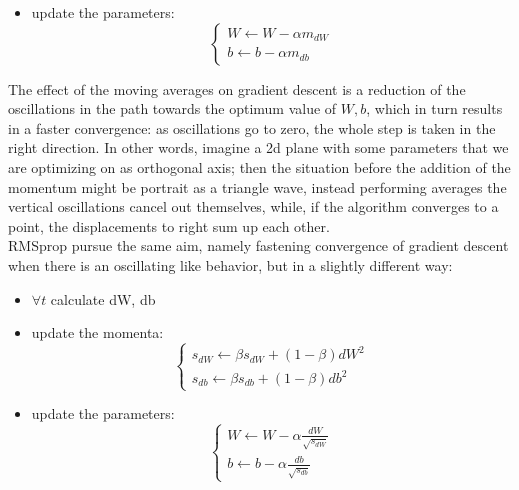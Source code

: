 \documentclass[12pt, a4paper]{report}
\theoremstyle{definition}
\begin{document}
{\begin{itemize}
\begin{equation}
	\begin{cases}
	m_{dW}\longleftarrow\beta m_{dW} + (1-\beta) dW\\
	m_{db}\longleftarrow\beta m_{db} + (1-\beta) db
	\end{cases}
	\end{equation}
	\item update the parameters:
	\begin{equation}
	\begin{cases}
	W\longleftarrow W - \alpha m_{dW}\\
	b\longleftarrow b - \alpha m_{db}
	\end{cases}
	\end{equation}
\end{itemize}
The effect of the moving averages on gradient descent is a reduction of the oscillations in the path towards the optimum value of $W,b$, which in turn results in a faster convergence: as oscillations go to zero, the whole step is taken in the right direction. In other words, imagine a 2d plane with some parameters that we are optimizing on as orthogonal axis; then the situation before the addition of the momentum might be portrait as a triangle wave, instead performing averages the vertical oscillations cancel out themselves, while, if the algorithm converges to a point, the displacements to right sum up each other.\\
\newline \noindent RMSprop pursue the same aim, namely fastening convergence of gradient descent when there is an oscillating like behavior, but in a slightly different way:
\begin{itemize}\label{RMSprop}
	\item $\forall t$ calculate dW, db
	\item update the momenta: 
	\begin{equation}\label{rms_prop_s}
	\begin{cases}
	s_{dW}\longleftarrow\beta s_{dW} + (1-\beta) dW^2\\
	s_{db}\longleftarrow\beta s_{db} + (1-\beta) db^2
	\end{cases}
	\end{equation}
	\item update the parameters:
	\begin{equation}\label{rms_prop_update}
	\begin{cases}
	W\longleftarrow W - \alpha \frac{dW}{\sqrt{s_{dW}}}\\
	b\longleftarrow b - \alpha \frac{db}{\sqrt{s_{db}}}
	\end{cases}

\end{equation}
\end{itemize}}
\end{document}
